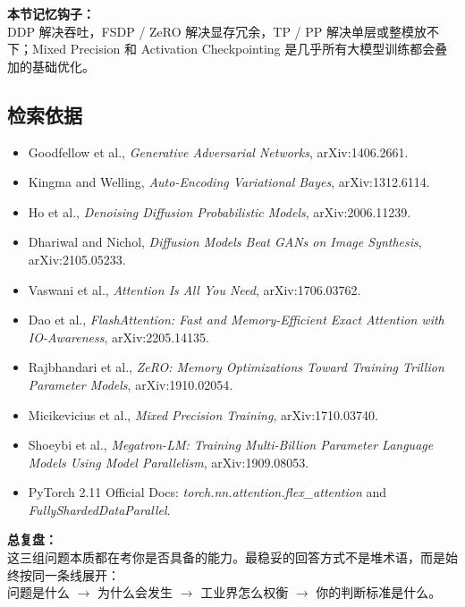 \begin{summarybox}
\textbf{本节记忆钩子：}\\
DDP 解决吞吐，FSDP / ZeRO 解决显存冗余，TP / PP 解决单层或整模放不下；Mixed Precision 和 Activation Checkpointing 是几乎所有大模型训练都会叠加的基础优化。
\end{summarybox}

\subsection{检索依据}

\begin{itemize}[leftmargin=1.5em]
  \item Goodfellow et al., \textit{Generative Adversarial Networks}, arXiv:1406.2661.
  \item Kingma and Welling, \textit{Auto-Encoding Variational Bayes}, arXiv:1312.6114.
  \item Ho et al., \textit{Denoising Diffusion Probabilistic Models}, arXiv:2006.11239.
  \item Dhariwal and Nichol, \textit{Diffusion Models Beat GANs on Image Synthesis}, arXiv:2105.05233.
  \item Vaswani et al., \textit{Attention Is All You Need}, arXiv:1706.03762.
  \item Dao et al., \textit{FlashAttention: Fast and Memory-Efficient Exact Attention with IO-Awareness}, arXiv:2205.14135.
  \item Rajbhandari et al., \textit{ZeRO: Memory Optimizations Toward Training Trillion Parameter Models}, arXiv:1910.02054.
  \item Micikevicius et al., \textit{Mixed Precision Training}, arXiv:1710.03740.
  \item Shoeybi et al., \textit{Megatron-LM: Training Multi-Billion Parameter Language Models Using Model Parallelism}, arXiv:1909.08053.
  \item PyTorch 2.11 Official Docs: \textit{torch.nn.attention.flex\_attention} and \textit{FullyShardedDataParallel}.
\end{itemize}

\begin{summarybox}
\textbf{总复盘：}\\
这三组问题本质都在考你是否具备的能力。最稳妥的回答方式不是堆术语，而是始终按同一条线展开：\\
问题是什么 $\rightarrow$ 为什么会发生 $\rightarrow$ 工业界怎么权衡 $\rightarrow$ 你的判断标准是什么。
\end{summarybox}
